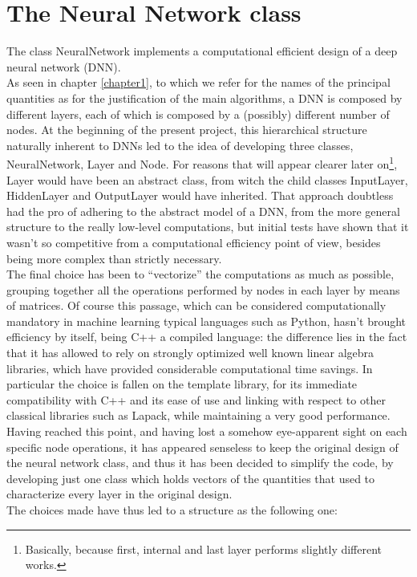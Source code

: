 \documentclass[12pt, a4paper]{report}
\theoremstyle{definition}
\begin{document}
\section{The Neural Network class}
The class NeuralNetwork implements a computational efficient design of a deep neural network (DNN).\\
As seen in chapter \ref{chapter1}, to which we refer for the names of the principal quantities as for the justification of the main algorithms, a DNN is composed by different layers, each of which is composed by a (possibly) different number of nodes. At the beginning of the present project, this hierarchical structure naturally inherent to DNNs led to the idea of developing three classes, NeuralNetwork, Layer and Node. For reasons that will appear clearer later on\footnote{Basically, because first, internal and last layer performs slightly different works.}, Layer would have been an abstract class, from witch the child classes InputLayer, HiddenLayer and OutputLayer would have inherited. That approach doubtless had the pro of adhering to the abstract model of a DNN, from the more general structure to the really low-level computations, but initial tests have shown that it wasn't so competitive from a computational efficiency point of view, besides being more complex than strictly necessary.\\
The final choice has been to ``vectorize'' the computations as much as possible, grouping together all the operations performed by nodes in each layer by means of matrices.
Of course this passage, which can be considered computationally mandatory in machine learning typical languages such as Python, hasn't brought efficiency by itself, being C++ a compiled language: the difference lies in the fact that it has allowed to rely on strongly optimized well known linear algebra libraries, which have provided considerable computational time savings. In particular the choice is fallen on the \cite{eigen} template library, for its immediate compatibility with C++ and its ease of use and linking with respect to other classical libraries such as Lapack, while maintaining a very good performance.
Having reached this point, and having lost a somehow eye-apparent  sight on each specific node operations, it has appeared senseless to keep the original design of the neural network class, and thus it has been decided to simplify the code, by developing just one class which holds vectors of the quantities that used to characterize every layer in the original design. \\
The choices made have thus led to a structure as the following one:
\end{document}
